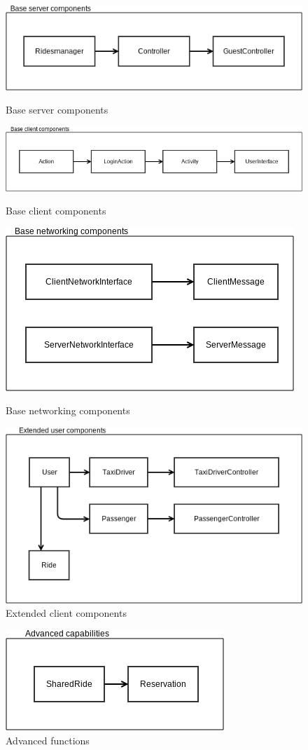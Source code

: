 \begin{figure} [h]
  \centering
  \includegraphics[scale=0.72]{diagrams/point 1.png}
  \caption{\label{fig:base_serv_comp} Base server components}
  \vspace{3mm}
  \includegraphics[scale=0.6]{diagrams/point 2.png}
  \caption{\label{fig:base_client_comp} Base client components}
  \vspace{3mm}
  \includegraphics[scale=0.72]{diagrams/point 3.png}
  \caption{\label{fig:base_net_comp} Base networking components}
  \vspace{3mm}
  \includegraphics[scale=0.68]{diagrams/point 5.png}
  \caption{\label{fig:ext_client_comp} Extended client components}
\end{figure}
\begin{figure} [h]
  \centering
  \includegraphics[scale=0.72]{diagrams/point 7.png}
  \caption{\label{fig:adv_func} Advanced functions}
\end{figure}


